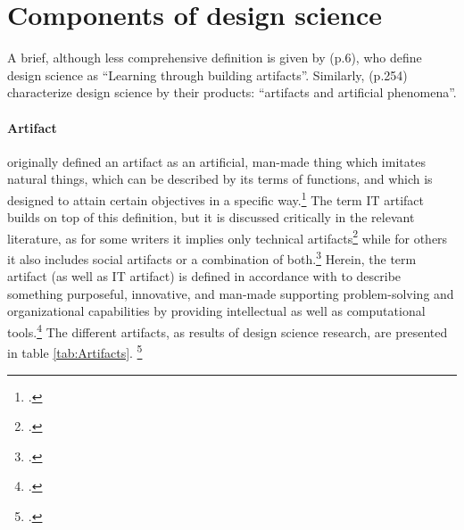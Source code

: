 \section{Components of design science} \label{sec:ComponentsDesignScience}
A brief, although less comprehensive definition is given by \cite{VaishnaviDesignScienceResearch} (p.6), who define design science as \enquote{Learning through building artifacts}. Similarly, \cite{MarchDesignnaturalscience1995} (p.254) characterize design science by their products: \enquote{artifacts and artificial phenomena}. 

\paragraph{Artifact} \cite{Simonsciencesartificial1996} originally defined an artifact as an artificial, man-made thing which imitates natural things, which can be described by its terms of functions, and which is designed to attain certain objectives in a specific way.\footcites[Cf.][p.5]{Simonsciencesartificial1996} The term IT artifact builds on top of this definition, but it is discussed critically in the relevant literature, as for some writers it implies only technical artifacts\footcites[Cf.][p.186]{BenbasatEmpiricalresearchinformation1999}[cf.][p.50]{AlterconceptITartifact2015}[cf.][p.121]{OrlikowskiResearchcommentaryDesperately2001} while for others it also includes social artifacts or a combination of both.\footcites[Cf.][pp.1,6]{LeeGoingbackbasics2015}[cf.][p.59]{AlterconceptITartifact2015} Herein, the term artifact (as well as IT artifact) is defined in accordance with \cite{HevnerDesignScienceResearch2004} to describe something purposeful, innovative, and man-made supporting problem-solving and organizational capabilities by providing intellectual as well as computational tools.\footcites[Cf.][pp.76,82]{HevnerDesignScienceResearch2004}[cf.][p.340]{GregorPositioningpresentingdesign2013} The different artifacts, as results of design science research, are presented in table \ref{tab:Artifacts}. \footcites[Cf.][pp.256-258]{MarchDesignnaturalscience1995}[cf.][p.50]{PuraoDesignResearchTechnology2002}[cf.][p.77]{HevnerDesignResearchInformation2010}


